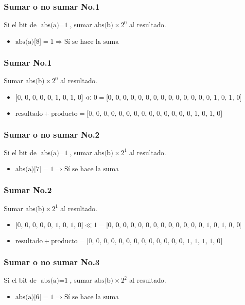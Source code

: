 \documentclass{beamer}
\begin{document}
\begin{frame}
\frametitle{Sumar o no sumar No.1}
Si el bit de $\text{abs(a)}=\text{1}$, sumar $\text{abs(b)}\times\text{2}^{\text{0}}$ al resultado.
\begin{itemize}
\item $\text{abs(a)[8]}=\text{1}\Longrightarrow\text{Sí se hace la suma}$
\end{itemize}
\end{frame}
\begin{frame}
\frametitle{Sumar No.1}
Sumar $\text{abs(b)}\times\text{2}^{\text{0}}$ al resultado.
\begin{itemize}
\item $\text{[0, 0, 0, 0, 0, 1, 0, 1, 0]}\ll\text{0}=\text{[0, 0, 0, 0, 0, 0, 0, 0, 0, 0, 0, 0, 0, 0, 1, 0, 1, 0]}$
\item $\text{resultado}+\text{producto}=\text{[0, 0, 0, 0, 0, 0, 0, 0, 0, 0, 0, 0, 0, 0, 1, 0, 1, 0]}$
\end{itemize}
\end{frame}
\begin{frame}
\frametitle{Sumar o no sumar No.2}
Si el bit de $\text{abs(a)}=\text{1}$, sumar $\text{abs(b)}\times\text{2}^{\text{1}}$ al resultado.
\begin{itemize}
\item $\text{abs(a)[7]}=\text{1}\Longrightarrow\text{Sí se hace la suma}$
\end{itemize}
\end{frame}
\begin{frame}
\frametitle{Sumar No.2}
Sumar $\text{abs(b)}\times\text{2}^{\text{1}}$ al resultado.
\begin{itemize}
\item $\text{[0, 0, 0, 0, 0, 1, 0, 1, 0]}\ll\text{1}=\text{[0, 0, 0, 0, 0, 0, 0, 0, 0, 0, 0, 0, 0, 1, 0, 1, 0, 0]}$
\item $\text{resultado}+\text{producto}=\text{[0, 0, 0, 0, 0, 0, 0, 0, 0, 0, 0, 0, 0, 1, 1, 1, 1, 0]}$
\end{itemize}
\end{frame}
\begin{frame}
\frametitle{Sumar o no sumar No.3}
Si el bit de $\text{abs(a)}=\text{1}$, sumar $\text{abs(b)}\times\text{2}^{\text{2}}$ al resultado.
\begin{itemize}
\item $\text{abs(a)[6]}=\text{1}\Longrightarrow\text{Sí se hace la suma}$
\end{itemize}
\end{frame}
\end{document}
